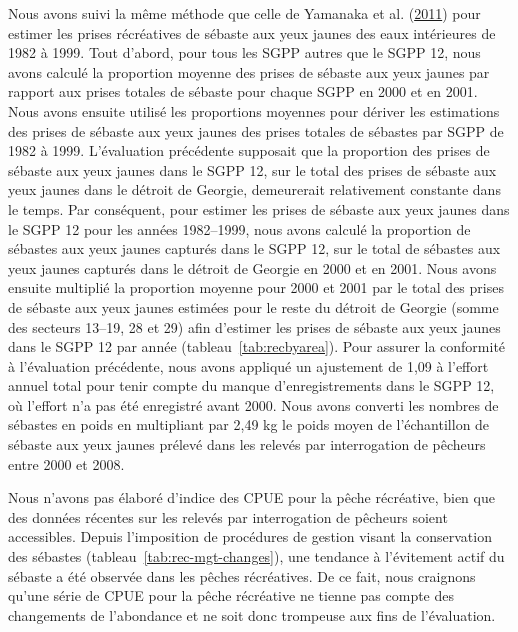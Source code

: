 \documentclass[11pt]{book}
\begin{document}
Nous avons suivi la même méthode que celle de Yamanaka et al. (\protect\hyperlink{ref-yamanaka2011}{2011}) pour estimer les prises récréatives de sébaste aux yeux jaunes des eaux intérieures de 1982 à 1999. Tout d'abord, pour tous les SGPP autres que le SGPP 12, nous avons calculé la proportion moyenne des prises de sébaste aux yeux jaunes par rapport aux prises totales de sébaste pour chaque SGPP en 2000 et en 2001. Nous avons ensuite utilisé les proportions moyennes pour dériver les estimations des prises de sébaste aux yeux jaunes des prises totales de sébastes par SGPP de 1982 à 1999. L'évaluation précédente supposait que la proportion des prises de sébaste aux yeux jaunes dans le SGPP 12, sur le total des prises de sébaste aux yeux jaunes dans le détroit de Georgie, demeurerait relativement constante dans le temps. Par conséquent, pour estimer les prises de sébaste aux yeux jaunes dans le SGPP 12 pour les années 1982--1999, nous avons calculé la proportion de sébastes aux yeux jaunes capturés dans le SGPP 12, sur le total de sébastes aux yeux jaunes capturés dans le détroit de Georgie en 2000 et en 2001. Nous avons ensuite multiplié la proportion moyenne pour 2000 et 2001 par le total des prises de sébaste aux yeux jaunes estimées pour le reste du détroit de Georgie (somme des secteurs 13--19, 28 et 29) afin d'estimer les prises de sébaste aux yeux jaunes dans le SGPP 12 par année (tableau~\ref{tab:recbyarea}). Pour assurer la conformité à l'évaluation précédente, nous avons appliqué un ajustement de 1,09 à l'effort annuel total pour tenir compte du manque d'enregistrements dans le SGPP 12, où l'effort n'a pas été enregistré avant 2000. Nous avons converti les nombres de sébastes en poids en multipliant par 2,49 kg le poids moyen de l'échantillon de sébaste aux yeux jaunes prélevé dans les relevés par interrogation de pêcheurs entre 2000 et 2008.

Nous n'avons pas élaboré d'indice des CPUE pour la pêche récréative, bien que des données récentes sur les relevés par interrogation de pêcheurs soient accessibles. Depuis l'imposition de procédures de gestion visant la conservation des sébastes (tableau~\ref{tab:rec-mgt-changes}), une tendance à l'évitement actif du sébaste a été observée dans les pêches récréatives. De ce fait, nous craignons qu'une série de CPUE pour la pêche récréative ne tienne pas compte des changements de l'abondance et ne soit donc trompeuse aux fins de l'évaluation.
\end{document}
